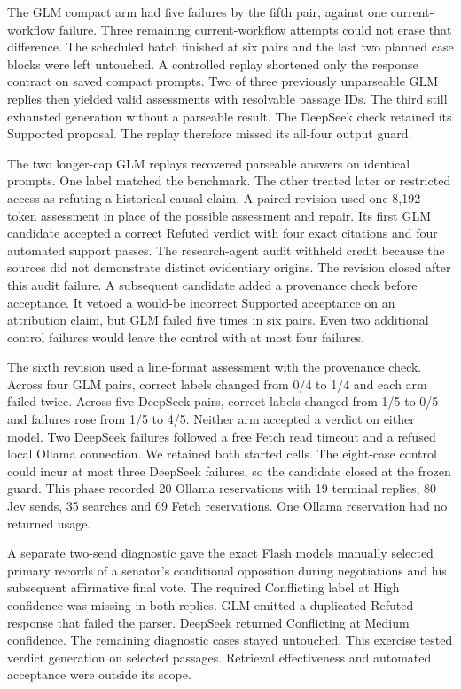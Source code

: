 \documentclass[conference]{IEEEtran}
\begin{document}
The GLM compact arm had five failures by the fifth pair, against one current-workflow failure. Three remaining current-workflow attempts could not erase that difference. The scheduled batch finished at six pairs and the last two planned case blocks were left untouched. A controlled replay shortened only the response contract on saved compact prompts. Two of three previously unparseable GLM replies then yielded valid assessments with resolvable passage IDs. The third still exhausted generation without a parseable result. The DeepSeek check retained its Supported proposal. The replay therefore missed its all-four output guard.

The two longer-cap GLM replays recovered parseable answers on identical prompts. One label matched the benchmark. The other treated later or restricted access as refuting a historical causal claim. A paired revision used one 8,192-token assessment in place of the possible assessment and repair. Its first GLM candidate accepted a correct Refuted verdict with four exact citations and four automated support passes. The research-agent audit withheld credit because the sources did not demonstrate distinct evidentiary origins. The revision closed after this audit failure. A subsequent candidate added a provenance check before acceptance. It vetoed a would-be incorrect Supported acceptance on an attribution claim, but GLM failed five times in six pairs. Even two additional control failures would leave the control with at most four failures.

The sixth revision used a line-format assessment with the provenance check. Across four GLM pairs, correct labels changed from 0/4 to 1/4 and each arm failed twice. Across five DeepSeek pairs, correct labels changed from 1/5 to 0/5 and failures rose from 1/5 to 4/5. Neither arm accepted a verdict on either model. Two DeepSeek failures followed a free Fetch read timeout and a refused local Ollama connection. We retained both started cells. The eight-case control could incur at most three DeepSeek failures, so the candidate closed at the frozen guard. This phase recorded 20 Ollama reservations with 19 terminal replies, 80 Jev sends, 35 searches and 69 Fetch reservations. One Ollama reservation had no returned usage.

A separate two-send diagnostic gave the exact Flash models manually selected primary records of a senator's conditional opposition during negotiations and his subsequent affirmative final vote. The required Conflicting label at High confidence was missing in both replies. GLM emitted a duplicated Refuted response that failed the parser. DeepSeek returned Conflicting at Medium confidence. The remaining diagnostic cases stayed untouched. This exercise tested verdict generation on selected passages. Retrieval effectiveness and automated acceptance were outside its scope.
\end{document}
